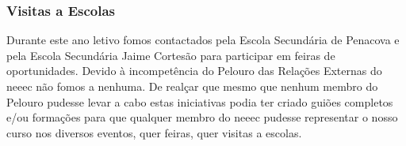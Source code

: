 
\subsubsection{Visitas a Escolas}

Durante este ano letivo fomos contactados pela Escola Secundária de Penacova e pela Escola Secundária Jaime Cortesão para participar em feiras de oportunidades. Devido à incompetência do Pelouro das Relações Externas do \acrshort{neeec} não fomos a nenhuma. De realçar que mesmo que nenhum membro do Pelouro pudesse levar a cabo estas iniciativas podia ter criado guiões completos e/ou formações para que qualquer membro do \acrshort{neeec} pudesse representar o nosso curso nos diversos eventos, quer feiras, quer visitas a escolas.